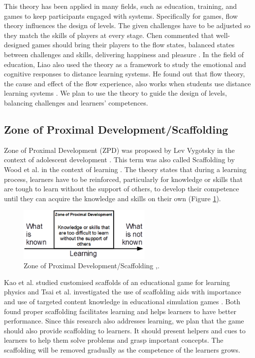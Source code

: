 \documentclass[12pt, a4paper]{report}
\begin{document}
This theory has been applied in many fields, such as education, training, and games to keep participants engaged with systems. Specifically for games, flow theory influences the design of levels. The given challenges have to be adjusted so they match the skills of players at every stage. Chen commented that well-designed games should bring their players to the flow states, balanced states between challenges and skills, delivering happiness and pleasure \cite{chen2007flow}. In the field of education, Liao also used the theory as a framework to study the emotional and cognitive responses to distance learning systems. He found out that flow theory, the cause and effect of the flow experience, also works when students use distance learning systems \cite{liao2006flow}. We plan to use the theory to guide the design of levels, balancing challenges and learners' competences. 

\subsection{Zone of Proximal Development/Scaffolding}
Zone of Proximal Development (ZPD) was proposed by Lev Vygotsky in the context of adolescent development \cite{vygotsky1978mind}. This term was also called Scaffolding by Wood et al. in the context of learning \cite{wood1976role}. The theory states that during a learning process, learners have to be reinforced, particularly for knowledge or skills that are tough to learn without the support of others, to develop their competence until they can acquire the knowledge and skills on their own (Figure \ref{scaffolding}). 

\begin{figure}[ht]
\centering
\includegraphics[width=6.5cm]{scaffolding}
\caption{Zone of Proximal Development/Scaffolding \cite{vygotsky1978mind},\cite{wood1976role}.}
\label{scaffolding}
\end{figure}

Kao et al. studied customised scaffolds of an educational game for learning physics \cite{kao2015designing} and Tsai et al. investigated the use of scaffolding aids with importance and use of targeted content knowledge in educational simulation games \cite{tsai2013importance}. Both found proper scaffolding facilitates learning and helps learners to have better performance. Since this research also addresses learning, we plan that the game should also provide scaffolding to learners. It should present helpers and cues to learners to help them solve problems and grasp important concepts. The scaffolding will be removed gradually as the competence of the learners grows.
\end{document}
